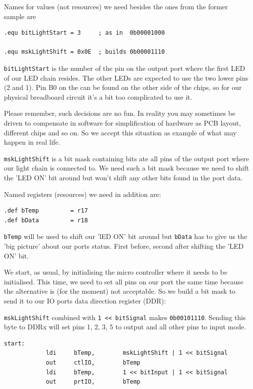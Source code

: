 Names for values (not resources) we need besides the ones from the former sample are

\begin{lstlisting}
.equ bitLightStart = 3     ; as in  0b00001000

.equ mskLightShift = 0x0E  ; builds 0b00001110
\end{lstlisting}

\texttt{bitLightStart} is the number of the pin on the output port where the first LED of our LED chain resides. The other LEDs are expected to use the two lower pins (2 and 1). Pin B0 on the \at can be found on the other side of the chips, so for our physical breadboard circuit it's a bit too complicated to use it.

Please remember, such decisions are no fun. In reality you may sometimes be driven to compensate in software for simplification of hardware as PCB layout, different chips and so on. So we accept this situation as example of what may happen in real life.

\texttt{mskLightShift} is a bit mask containing bits ate all pins of the output port where our light chain is connected to. We need such a bit mask because we need to shift the 'LED ON' bit around but won't shift any other bits found in the port data.

Named registers (resources) we need in addition are:
 
\begin{lstlisting}
.def bTemp         = r17
.def bData         = r18
\end{lstlisting}

\texttt{bTemp} will be used to shift our 'lED ON' bit around but \texttt{bData} has to give us the 'big picture' about our ports status. First before, second after shifting the 'LED ON' bit.

We start, as usual, by initialising the micro controller where it needs to be initialised. This time, we need to set all pins on our port the same time because the alternative is (for the moment) not acceptable. So we build a bit mask to send it to our IO ports data direction register (DDR):

\texttt{mskLightShift} combined with \texttt{1 << bitSignal} makes \texttt{0b00101110}. Sending this byte to DDRx will set pins 1, 2, 3, 5 to output and all other pins to input mode.

\begin{lstlisting}
start:
            ldi     bTemp,        mskLightShift | 1 << bitSignal
            out     ctlIO,        bTemp
            ldi     bTemp,        1 << bitInput | 1 << bitSignal
            out     prtIO,        bTemp
\end{lstlisting}

